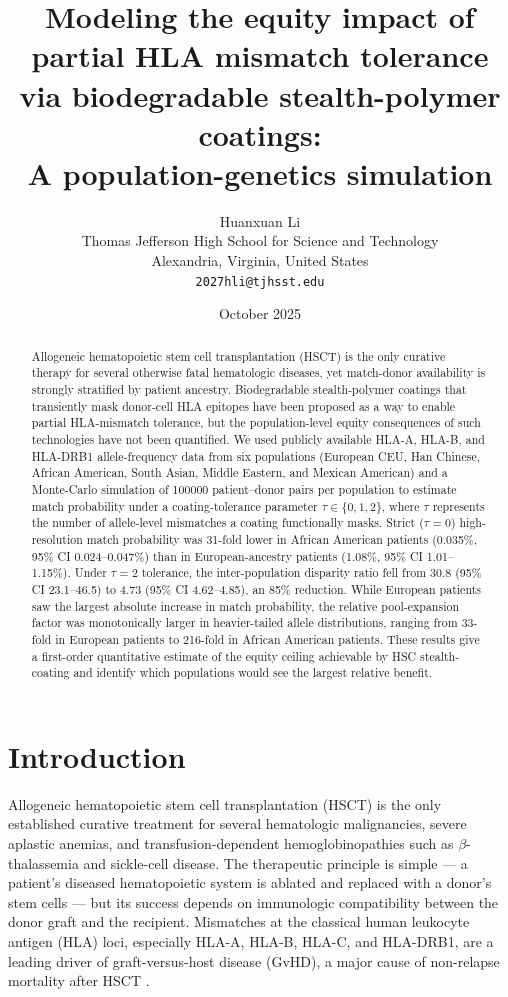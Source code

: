 \documentclass[11pt]{article}
\title{
\textbf{Modeling the equity impact of partial HLA mismatch tolerance via biodegradable stealth-polymer coatings:\\
A population-genetics simulation}
}
\author{
Huanxuan Li\\
\small Thomas Jefferson High School for Science and Technology\\
\small Alexandria, Virginia, United States\\
\small \texttt{2027hli@tjhsst.edu}
}
\date{October 2025}
\begin{document}
\maketitle

\begin{abstract}
\noindent
Allogeneic hematopoietic stem cell transplantation (HSCT) is the only curative therapy for several otherwise fatal hematologic diseases, yet match-donor availability is strongly stratified by patient ancestry. Biodegradable stealth-polymer coatings that transiently mask donor-cell HLA epitopes have been proposed as a way to enable partial HLA-mismatch tolerance, but the population-level equity consequences of such technologies have not been quantified. We used publicly available HLA-A, HLA-B, and HLA-DRB1 allele-frequency data from six populations (European CEU, Han Chinese, African American, South Asian, Middle Eastern, and Mexican American) and a Monte-Carlo simulation of \num{100000} patient--donor pairs per population to estimate match probability under a coating-tolerance parameter $\tau \in \{0,1,2\}$, where $\tau$ represents the number of allele-level mismatches a coating functionally masks. Strict ($\tau = 0$) high-resolution match probability was 31-fold lower in African American patients (0.035\%, 95\% CI 0.024--0.047\%) than in European-ancestry patients (1.08\%, 95\% CI 1.01--1.15\%). Under $\tau = 2$ tolerance, the inter-population disparity ratio fell from 30.8 (95\% CI 23.1--46.5) to 4.73 (95\% CI 4.62--4.85), an 85\% reduction. While European patients saw the largest absolute increase in match probability, the relative pool-expansion factor was monotonically larger in heavier-tailed allele distributions, ranging from 33-fold in European patients to 216-fold in African American patients. These results give a first-order quantitative estimate of the equity ceiling achievable by HSC stealth-coating and identify which populations would see the largest relative benefit.
\end{abstract}

\section{Introduction}
\label{sec:intro}

Allogeneic hematopoietic stem cell transplantation (HSCT) is the only established curative treatment for several hematologic malignancies, severe aplastic anemias, and transfusion-dependent hemoglobinopathies such as \(\beta\)-thalassemia and sickle-cell disease. The therapeutic principle is simple --- a patient's diseased hematopoietic system is ablated and replaced with a donor's stem cells --- but its success depends on immunologic compatibility between the donor graft and the recipient. Mismatches at the classical human leukocyte antigen (HLA) loci, especially HLA-A, HLA-B, HLA-C, and HLA-DRB1, are a leading driver of graft-versus-host disease (GvHD), a major cause of non-relapse mortality after HSCT \citep{lee2007high,tiercy2016hla,choo2007hla}.
\end{document}
